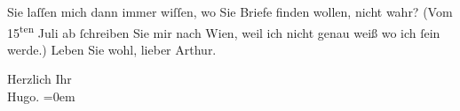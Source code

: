 \pstart
           Sie laſſen mich dann immer wiſſen, wo Sie Briefe finden wollen, nicht wahr? (Vom
                     15\textsuperscript{ten} Juli ab ſchreiben Sie mir nach
                  Wien, weil ich nicht genau weiß wo ich ſein
               werde.) Leben Sie wohl, lieber Arthur.\pend
           
\pstart
           Herzlich Ihr{\\[\baselineskip]}\spacefill\mbox{Hugo.}\pend
           \leftskip=0em{}\endnumbering{}  
      